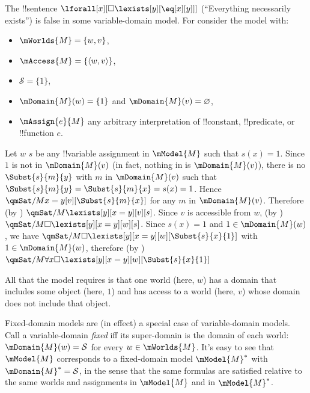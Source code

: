 \documentclass[../../../include/open-logic-section]{subfiles}
\begin{document}
\begin{ex}
The !!{sentence} $\lforall[x][\Box\lexists[y][\eq[x][y]]]$ 
(``Everything necessarily exists'') is false in some variable-domain 
model. For consider the model with:
\begin{itemize}
  \item $\mWorlds{M}=\{w,v\}$,
  \item $\mAccess{M}=\{\langle w,v\rangle\}$,
  \item $\mathcal{S}=\{1\}$,
  \item $\mDomain{M}(w)=\{1\}$ and $\mDomain{M}(v)=\varnothing$,
  \item $\mAssign{e}{M}$ any arbitrary interpretation of !!{constant},
  !!{predicate}, or !!{function} $e$.
\end{itemize}
Let $w$ $s$ be any !!{variable} assignment in $\mModel{M}$ such that
$s(x)=1$. Since $1$ is not in $\mDomain{M}(v)$ (in fact, nothing in is
$\mDomain{M}(v)$), there is no $\Subst{s}{m}{y}$ with $m$ in
$\mDomain{M}(v)$ such that $\Subst{s}{m}{y}=\Subst{s}{m}{x}=s(x)=1$.
Hence $\qmSat/{M}{x=y}[v][\Subst{s}{m}{x}]$ for any $m$ in
$\mDomain{M}(v)$. Therefore (by )
$\qmSat/{M}{\lexists[y][x=y]}[v][s]$. Since $v$ is accessible from
$w$, (by )
$\qmSat/{M}{\Box\lexists[y][x=y]}[w][s]$. Since $s(x)=1$
and $1\in \mDomain{M}(w)$, we have  
$\qmSat/{M}{\Box\lexists[y][x=y]}[w][\Subst{s}{x}{1}]$
with $1\in \mDomain{M}(w)$, therefore (by )
$\qmSat/{M}{\forall x\Box\lexists[y][x=y]}[w][\Subst{s}{x}{1}]$

All that the model requires is that one world (here, $w$) has
a domain that includes some object (here, $1$) and has access
to a world (here, $v$) whose domain does not include that object.
\end{ex}

\begin{rem}
Fixed-domain models are (in effect) a special case of variable-domain
models. Call a variable-domain \emph{fixed} iff its super-domain is
the domain of each world: $\mDomain{M}(w)=\mathcal{S}$ for every
$w\in\mWorlds{M}$. It's easy to see that $\mModel{M}$ corresponds to a
fixed-domain model $\mModel{M}^*$ with $\mDomain{M}^*=\mathcal{S}$, in
the sense that the same formulas are satisfied relative to the same
worlds and assignments in $\mModel{M}$ and in $\mModel{M}^*$.
\end{rem}
\end{document}
